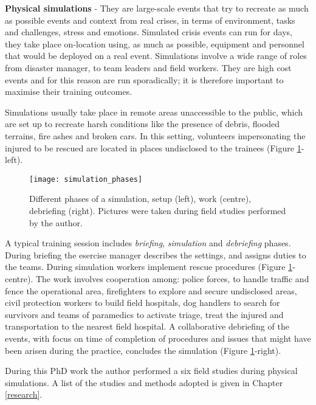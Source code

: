\textbf{Physical simulations} - They are large-scale events that try to recreate as much as possible events and context from real crises, in terms of environment, tasks and challenges, stress and emotions. Simulated crisis events can run for days, they take place on-location using, as much as possible, equipment and personnel that would be deployed on a real event. Simulations involve a wide range of roles from disaster manager, to team leaders and field workers. They are high cost events and for this reason are run sporadically; it is therefore important to maximise their training outcomes.

Simulations usually take place in remote areas unaccessible to the public, which are set up to recreate harsh conditions like the presence of debris, flooded terrains, fire ashes and broken cars. In this setting, volunteers impersonating the injured to be rescued are located in places undisclosed to the trainees (Figure \ref{fig:simulation-phases}-left).
\begin{figure}
	[tbh] \centering 
	\texttt{[image: simulation\_phases]} \caption{Different phases of a simulation, setup (left), work (centre), debriefing (right). Pictures were taken during field studies performed by the author.} \label{fig:simulation-phases} 
\end{figure}

A typical training session includes \emph{briefing}, \emph{simulation} and \emph{debriefing} phases. During briefing the esercise manager describes the settings, and assigns duties to the teams. During simulation workers implement rescue procedures (Figure \ref{fig:simulation-phases}-centre). The work involves cooperation among: police forces, to handle traffic and fence the operational area, firefighters to explore and secure undisclosed areas, civil protection workers to build field hospitals, dog handlers to search for survivors and teams of paramedics to activate triage, treat the injured and transportation to the nearest field hospital. A collaborative debriefing of the events, with focus on time of completion of procedures and issues that might have been arisen during the practice, concludes the simulation (Figure \ref{fig:simulation-phases}-right).

During this PhD work the author performed a six field studies during physical simulations. A list of the studies and methods adopted is given in Chapter \ref{research}.

